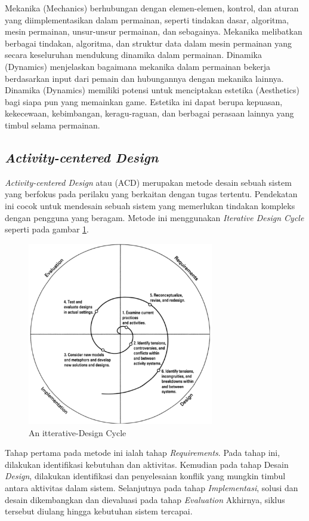 Mekanika (Mechanics) berhubungan dengan elemen-elemen, kontrol, dan aturan yang diimplementasikan dalam permainan, seperti tindakan dasar, algoritma, mesin permainan, unsur-unsur permainan, dan sebagainya.
Mekanika melibatkan berbagai tindakan, algoritma, dan struktur data dalam mesin permainan yang secara keseluruhan mendukung dinamika dalam permainan.
Dinamika (Dynamics) menjelaskan bagaimana mekanika dalam permainan bekerja berdasarkan input dari pemain dan hubungannya dengan mekanika lainnya.
Dinamika (Dynamics) memiliki potensi untuk menciptakan estetika (Aesthetics) bagi siapa pun yang memainkan game. Estetika ini dapat berupa kepuasan, kekecewaan, kebimbangan, keragu-raguan, dan berbagai perasaan lainnya yang timbul selama permainan.
\subsection{\textit{Activity-centered Design}}
\textit{Activity-centered Design} atau (ACD) merupakan metode desain sebuah sistem yang berfokus pada perilaku yang berkaitan dengan tugas tertentu.
Pendekatan ini cocok untuk mendesain sebuah sistem yang memerlukan tindakan kompleks dengan pengguna yang beragam. Metode ini menggunakan \textit{Iterative Design Cycle} seperti pada gambar \ref*{Fig:itterative-Design Cycle}.
\begin{figure}[H]
	\centering
	\includegraphics[height=8cm]{contents/chapter-2/images/Itterative-design.png}
	\caption{An itterative-Design Cycle \cite{2004activity}}
	\label{Fig:itterative-Design Cycle}
\end{figure}
Tahap pertama pada metode ini ialah tahap \textit{Requirements}. Pada tahap ini, dilakukan identifikasi kebutuhan dan aktivitas. 
Kemudian pada tahap Desain \textit{Design}, dilakukan identifikasi dan penyelesaian konflik yang mungkin timbul antara aktivitas dalam sistem.
Selanjutnya pada tahap \textit{Implementasi}, solusi dan desain dikembangkan dan dievaluasi pada tahap \textit{Evaluation}
Akhirnya, siklus tersebut diulang hingga kebutuhan sistem tercapai.
